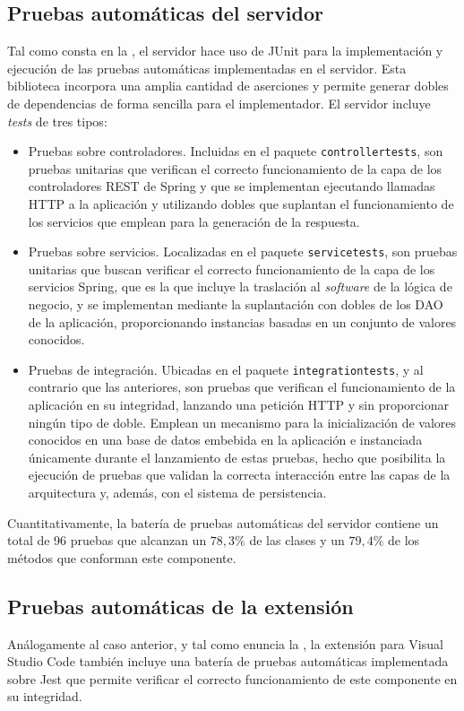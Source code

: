 \subsection{Pruebas automáticas del servidor}
\label{subsec:testingServidor}
Tal como consta en la , el servidor hace uso de JUnit para la implementación y ejecución de las pruebas automáticas implementadas en el servidor. Esta biblioteca incorpora una amplia cantidad de aserciones y permite generar dobles de dependencias de forma sencilla para el implementador. El servidor incluye \textit{tests} de tres tipos:
\begin{itemize}
    \item Pruebas sobre controladores. Incluidas en el paquete \texttt{controllertests}, son pruebas unitarias que verifican el correcto funcionamiento de la capa de los controladores REST de Spring y que se implementan ejecutando llamadas HTTP a la aplicación y utilizando dobles que suplantan el funcionamiento de los servicios que emplean para la generación de la respuesta.
    \item Pruebas sobre servicios. Localizadas en el paquete \texttt{servicetests}, son pruebas unitarias que buscan verificar el correcto funcionamiento de la capa de los servicios Spring, que es la que incluye la traslación al \textit{software} de la lógica de negocio, y se implementan mediante la suplantación con dobles de los DAO de la aplicación, proporcionando instancias basadas en un conjunto de valores conocidos.
    \item Pruebas de integración. Ubicadas en el paquete \texttt{integrationtests}, y al contrario que las anteriores, son pruebas que verifican el funcionamiento de la aplicación en su integridad, lanzando una petición HTTP y sin proporcionar ningún tipo de doble. Emplean un mecanismo para la inicialización de valores conocidos en una base de datos embebida en la aplicación e instanciada únicamente durante el lanzamiento de estas pruebas, hecho que posibilita la ejecución de pruebas que validan la correcta interacción entre las capas de la arquitectura y, además, con el sistema de persistencia.
\end{itemize}

Cuantitativamente, la batería de pruebas automáticas del servidor contiene un total de 96 pruebas que alcanzan un $78,3\%$ de las clases y un $79,4\%$ de los métodos que conforman este componente.

\subsection{Pruebas automáticas de la extensión}
\label{subsec:testingExtension}
Análogamente al caso anterior, y tal como enuncia la , la extensión para Visual Studio Code también incluye una batería de pruebas automáticas implementada sobre Jest que permite verificar el correcto funcionamiento de este componente en su integridad.

